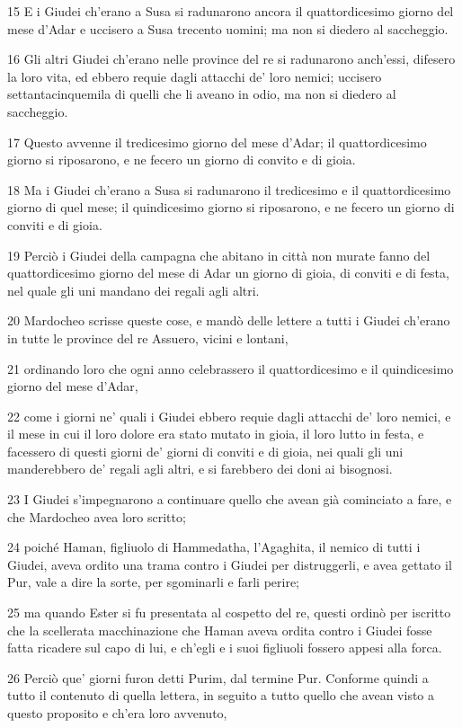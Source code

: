 \par 15 E i Giudei ch'erano a Susa si radunarono ancora il quattordicesimo giorno del mese d'Adar e uccisero a Susa trecento uomini; ma non si diedero al saccheggio.
\par 16 Gli altri Giudei ch'erano nelle province del re si radunarono anch'essi, difesero la loro vita, ed ebbero requie dagli attacchi de' loro nemici; uccisero settantacinquemila di quelli che li aveano in odio, ma non si diedero al saccheggio.
\par 17 Questo avvenne il tredicesimo giorno del mese d'Adar; il quattordicesimo giorno si riposarono, e ne fecero un giorno di convito e di gioia.
\par 18 Ma i Giudei ch'erano a Susa si radunarono il tredicesimo e il quattordicesimo giorno di quel mese; il quindicesimo giorno si riposarono, e ne fecero un giorno di conviti e di gioia.
\par 19 Perciò i Giudei della campagna che abitano in città non murate fanno del quattordicesimo giorno del mese di Adar un giorno di gioia, di conviti e di festa, nel quale gli uni mandano dei regali agli altri.
\par 20 Mardocheo scrisse queste cose, e mandò delle lettere a tutti i Giudei ch'erano in tutte le province del re Assuero, vicini e lontani,
\par 21 ordinando loro che ogni anno celebrassero il quattordicesimo e il quindicesimo giorno del mese d'Adar,
\par 22 come i giorni ne' quali i Giudei ebbero requie dagli attacchi de' loro nemici, e il mese in cui il loro dolore era stato mutato in gioia, il loro lutto in festa, e facessero di questi giorni de' giorni di conviti e di gioia, nei quali gli uni manderebbero de' regali agli altri, e si farebbero dei doni ai bisognosi.
\par 23 I Giudei s'impegnarono a continuare quello che avean già cominciato a fare, e che Mardocheo avea loro scritto;
\par 24 poiché Haman, figliuolo di Hammedatha, l'Agaghita, il nemico di tutti i Giudei, aveva ordito una trama contro i Giudei per distruggerli, e avea gettato il Pur, vale a dire la sorte, per sgominarli e farli perire;
\par 25 ma quando Ester si fu presentata al cospetto del re, questi ordinò per iscritto che la scellerata macchinazione che Haman aveva ordita contro i Giudei fosse fatta ricadere sul capo di lui, e ch'egli e i suoi figliuoli fossero appesi alla forca.
\par 26 Perciò que' giorni furon detti Purim, dal termine Pur. Conforme quindi a tutto il contenuto di quella lettera, in seguito a tutto quello che avean visto a questo proposito e ch'era loro avvenuto,
